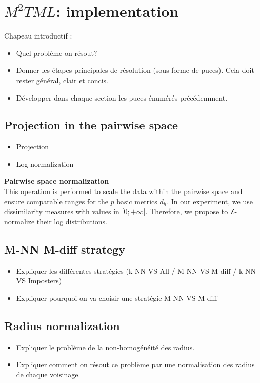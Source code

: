 \chapter{$M^2TML$: implementation}
\label{sec:unchapitre}
\minitoc

\noindent Chapeau introductif :
\begin{itemize}
	\item Quel problème on résout?
	\item Donner les étapes principales de résolution (sous forme de puces). Cela doit rester général, clair et concis.
	\item Développer dans chaque section les puces énumérés précédemment.
\end{itemize}

\section{Projection in the pairwise space}
\begin{itemize}
	\item Projection
	\item Log normalization
\end{itemize}
\noindent \textbf{Pairwise space normalization} \\
This operation is performed to scale the data within the pairwise space and ensure comparable ranges for the $p$ basic metrics $d_h$. In our experiment, we use dissimilarity measures with values in $[0;+\infty[$. Therefore, we propose to Z-normalize their log distributions. \\

\section{M-NN M-diff strategy}
\begin{itemize}
	\item Expliquer les différentes stratégies (k-NN VS All / M-NN VS M-diff / k-NN VS Imposters)
	\item Expliquer pourquoi on va choisir une stratégie M-NN VS M-diff
\end{itemize}


\section{Radius normalization}
\begin{itemize}
	\item Expliquer le problème de la non-homogénéité des radius.
	\item Expliquer comment on résout ce problème par une normalisation des radius de chaque voisinage.
\end{itemize}


